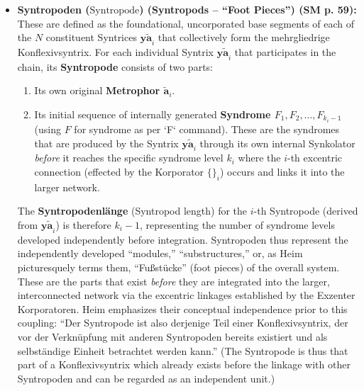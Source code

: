 \documentclass[12pt]{article}
\newcommand{\q}[1]{\enquote{#1}}
\newcommand{\syntrix}{\bm{y\widetilde{a}}}
\newcommand{\metrophor}{\bm{\widetilde{a}}}
\newcommand{\syndrom}{F} %
\newcommand{\syntropode}{\text{Syntropode}}
\begin{document}
\begin{itemize}
    \item \textbf{Syntropoden (\(\syntropode\)) (Syntropods – \q{Foot Pieces}) (SM p. 59):}
    These are defined as the foundational, uncorporated base segments of each of the \( N \) constituent Syntrices \( \syntrix_i \) that collectively form the mehrgliedrige Konflexivsyntrix. For each individual Syntrix \( \syntrix_i \) that participates in the chain, its \textbf{Syntropode} consists of two parts:
    \begin{enumerate}
        \item Its own original \textbf{Metrophor \( \metrophor_i \)}.
        \item Its initial sequence of internally generated \textbf{Syndrome \( \syndrom_1, \syndrom_2, \dots, \syndrom_{k_i-1} \)} (using \(F\) for syndrome as per `\syndrom` command). These are the syndromes that are produced by the Syntrix \( \syntrix_i \) through its own internal Synkolator \textit{before} it reaches the specific syndrome level \( k_i \) where the \( i \)-th excentric connection (effected by the Korporator \( \{ \}_i \)) occurs and links it into the larger network.
    \end{enumerate}
    The \textbf{Syntropodenlänge} (Syntropod length) for the \(i\)-th Syntropode (derived from \( \syntrix_i \)) is therefore \( k_i - 1 \), representing the number of syndrome levels developed independently before integration. Syntropoden thus represent the independently developed \q{modules,} \q{substructures,} or, as Heim picturesquely terms them, \q{Fußstücke} (foot pieces) of the overall system. These are the parts that exist \textit{before} they are integrated into the larger, interconnected network via the excentric linkages established by the Exzenter Korporatoren. Heim emphasizes their conceptual independence prior to this coupling: \q{Der Syntropode ist also derjenige Teil einer Konflexivsyntrix, der vor der Verknüpfung mit anderen Syntropoden bereits existiert und als selbständige Einheit betrachtet werden kann.} (The Syntropode is thus that part of a Konflexivsyntrix which already exists before the linkage with other Syntropoden and can be regarded as an independent unit.)


\end{itemize}
\end{document}
